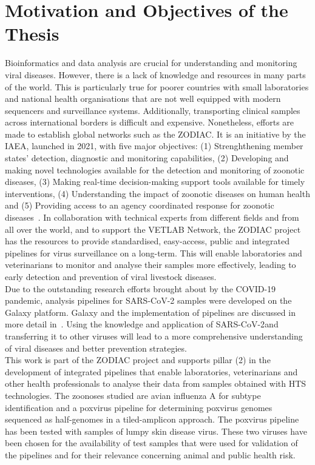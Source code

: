 \section{Motivation and Objectives of the Thesis}
Bioinformatics and data analysis are crucial for understanding and monitoring viral diseases. However, there is a lack of knowledge and resources in many parts of the world. This is particularly true for poorer countries with small laboratories and national health organisations that are not well equipped with modern sequencers and surveillance systems. Additionally, transporting clinical samples across international borders is difficult and expensive. Nonetheless, efforts are made to establish global networks such as the \ac{ZODIAC}. It is an initiative by the \ac{IAEA}, launched in 2021, with five major objectives: (1) Strenghthening member states' detection, diagnostic and monitoring capabilities, (2) Developing and making novel technologies available for the detection and monitoring of zoonotic diseases, (3) Making real-time decision-making support tools available for timely interventions, (4) Understanding the impact of zoonotic diseases on human health and (5) Providing access to an agency coordinated response for zoonotic diseases~\cite{zodiac2021}. In collaboration with technical experts from different fields and from all over the world, and to support the \ac{VETLAB} Network, the \ac{ZODIAC} project has the resources to provide standardised, easy-access, public and integrated pipelines for virus surveillance on a long-term. This will enable laboratories and veterinarians to monitor and analyse their samples more effectively, leading to early detection and prevention of viral livestock diseases. \\
Due to the outstanding research efforts brought about by the \ac{COVID-19} pandemic, analysis pipelines for \ac{SARS-CoV-2} samples were developed on the Galaxy platform. Galaxy and the implementation of pipelines are discussed in more detail in~. Using the knowledge and application of \ac{SARS-CoV-2}and transferring it to other viruses will lead to a more comprehensive understanding of viral diseases and better prevention strategies.\\
This work is part of the \ac{ZODIAC} project and supports pillar (2) in the development of integrated pipelines that enable laboratories, veterinarians and other health professionals to analyse their data from samples obtained with \ac{HTS} technologies. The zoonoses studied are avian influenza A for subtype identification and a poxvirus pipeline for determining poxvirus genomes sequenced as half-genomes in a tiled-amplicon approach. The poxvirus pipeline has been tested with samples of lumpy skin disease virus. These two viruses have been chosen for the availability of test samples that were used for validation of the pipelines and for their relevance concerning animal and public health risk. \\
